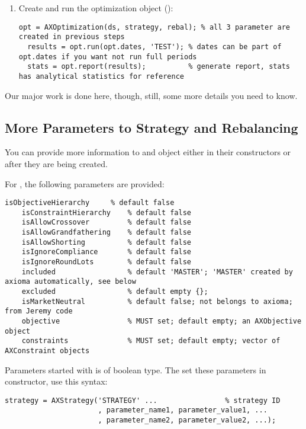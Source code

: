 \begin{enumerate}
    \item Create and run the optimization object ():
          \begin{lstlisting}[numbers=none]
  opt = AXOptimization(ds, strategy, rebal); % all 3 parameter are created in previous steps
  results = opt.run(opt.dates, 'TEST'); % dates can be part of opt.dates if you want not run full periods
  stats = opt.report(results);          % generate report, stats has analytical statistics for reference
          \end{lstlisting}
\end{enumerate}
   
Our major work is done here,
though, still, some more details you need to know.

\subsection{More Parameters to Strategy and Rebalancing}

You can provide more information to  and  object 
either in their constructors or after they are being created.

For , the following parameters are provided:

\begin{lstlisting}[numbers=none]
    isObjectiveHierarchy     % default false
    isConstraintHierarchy    % default false
    isAllowCrossover         % default false
    isAllowGrandfathering    % default false
    isAllowShorting          % default false
    isIgnoreCompliance       % default false
    isIgnoreRoundLots        % default false
    included                 % default 'MASTER'; 'MASTER' created by axioma automatically, see below
    excluded                 % default empty {};
    isMarketNeutral          % default false; not belongs to axioma; from Jeremy code
    objective                % MUST set; default empty; an AXObjective object 
    constraints              % MUST set; default empty; vector of AXConstraint objects
\end{lstlisting}

Parameters started with  is of boolean type.
The set these parameters in constructor, use this syntax:
\begin{lstlisting}[numbers=none]
   strategy = AXStrategy('STRATEGY' ...                % strategy ID
                      , parameter_name1, parameter_value1, ...
                      , parameter_name2, parameter_value2, ...);
\end{lstlisting}

